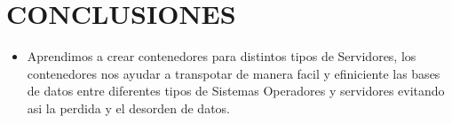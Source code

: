 \section{CONCLUSIONES} 

\begin{itemize}
	\item Aprendimos a crear contenedores para distintos tipos de Servidores, los contenedores nos ayudar a transpotar de manera facil y efiniciente las bases de datos entre diferentes tipos de Sistemas Operadores y servidores evitando asi la perdida y el desorden de datos.
	
	



\end{itemize}